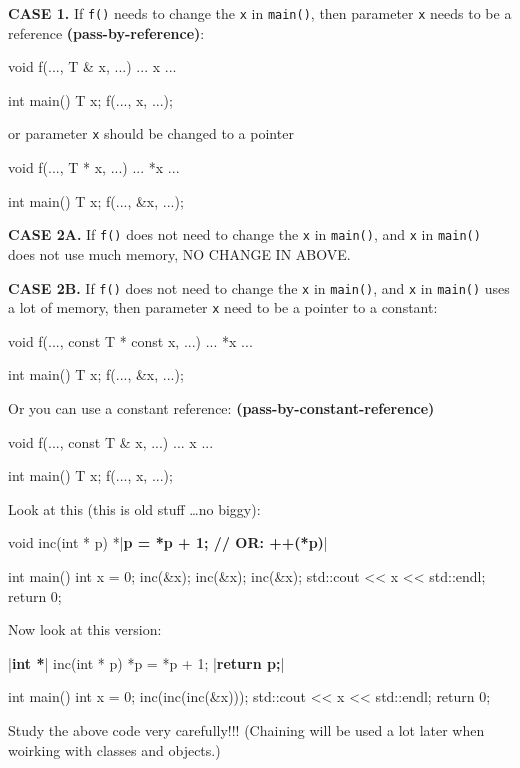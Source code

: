 \textbf{CASE 1.} If \texttt{f()} needs to change the \texttt{x} in \texttt{main()}, then parameter \texttt{x} needs to be a reference \textbf{(pass-by-reference)}:

\begin{consolethree}[escapeinside=||]
void f(..., T & x, ...)
{
    ... x ...
}

int main()
{
    T x;
    f(..., x, ...);
}
\end{consolethree}
or parameter \texttt{x} should be changed to a pointer

\begin{consolethree}[escapeinside=||]
void f(..., T * x, ...)
{
    ... *x ...
}

int main()
{
    T x;
    f(..., &x, ...);
}
\end{consolethree}
\textbf{CASE 2A.} If \texttt{f()} does not need to change the \texttt{x} in \texttt{main()}, and \texttt{x} in \texttt{main()} does not use much memory, NO CHANGE IN ABOVE.

\textbf{CASE 2B.} If \texttt{f()} does not need to change the \texttt{x} in \texttt{main()}, and \texttt{x} in \texttt{main()} uses a lot of memory, then parameter \texttt{x} need to be a pointer to a constant:

\begin{consolethree}[escapeinside=||]
void f(..., const T * const x, ...)
{
    ... *x ...
}

int main()
{
    T x;
    f(..., &x, ...);
}
\end{consolethree}
Or you can use a constant reference:
\textbf{(pass-by-constant-reference)}

\begin{consolethree}[escapeinside=||]
void f(..., const T & x, ...)
{
    ... x ...
}

int main()
{
    T x;
    f(..., x, ...);
}
\end{consolethree}

\newpage{}

Look at this (this is old stuff \ldots no biggy):

\begin{consolethree}[escapeinside=||]
void inc(int * p)
{
    *|\textbf{p = *p + 1; // OR: ++(*p)}|
}

int main()
{
    int x = 0;
    inc(&x); inc(&x); inc(&x);
    std::cout << x << std::endl;
    return 0;
}
\end{consolethree}
Now look at this version:

\begin{consolethree}[escapeinside=||]

|\textbf{int *}| inc(int * p)
{
    *p = *p + 1;
    |\textbf{return p;}|
}

int main()
{
    int x = 0;
    inc(inc(inc(&x)));
    std::cout << x << std::endl;
    return 0;
}
\end{consolethree}
Study the above code very carefully!!! (Chaining will be used a lot later when woirking with classes and objects.)

